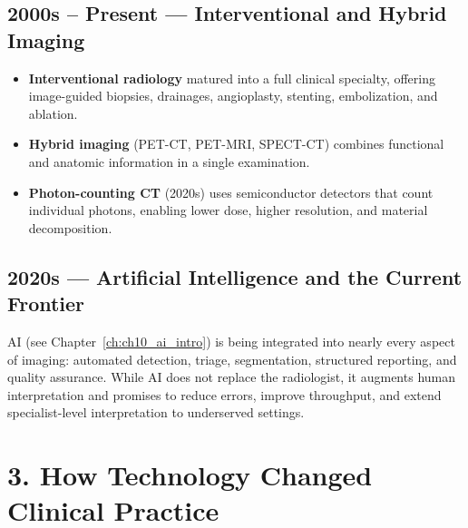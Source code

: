 \subsection*{2000s -- Present --- Interventional and Hybrid Imaging}
\begin{itemize}
    \item \textbf{Interventional radiology} matured into a full clinical specialty, offering image-guided biopsies, drainages, angioplasty, stenting, embolization, and ablation.
    \item \textbf{Hybrid imaging} (PET-CT, PET-MRI, SPECT-CT) combines functional and anatomic information in a single examination.
    \item \textbf{Photon-counting CT} (2020s) uses semiconductor detectors that count individual photons, enabling lower dose, higher resolution, and material decomposition.
\end{itemize}

\subsection*{2020s --- Artificial Intelligence and the Current Frontier}
AI (see Chapter~\ref{ch:ch10_ai_intro}) is being integrated into nearly every aspect of imaging: automated detection, triage, segmentation, structured reporting, and quality assurance. While AI does not replace the radiologist, it augments human interpretation and promises to reduce errors, improve throughput, and extend specialist-level interpretation to underserved settings.


\section*{3. How Technology Changed Clinical Practice}


